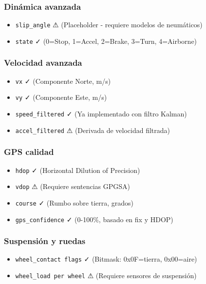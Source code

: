 \documentclass[11pt,a4paper]{article}
\begin{document}
\subsubsection{Dinámica avanzada}
\begin{itemize}
    \item \texttt{slip\_angle} ⚠ (Placeholder - requiere modelos de neumáticos)
    \item \texttt{state} ✓ (0=Stop, 1=Accel, 2=Brake, 3=Turn, 4=Airborne)
\end{itemize}

\subsubsection{Velocidad avanzada}
\begin{itemize}
    \item \texttt{vx} ✓ (Componente Norte, m/s)
    \item \texttt{vy} ✓ (Componente Este, m/s)
    \item \texttt{speed\_filtered} ✓ (Ya implementado con filtro Kalman)
    \item \texttt{accel\_filtered} ⚠ (Derivada de velocidad filtrada)
\end{itemize}

\subsubsection{GPS calidad}
\begin{itemize}
    \item \texttt{hdop} ✓ (Horizontal Dilution of Precision)
    \item \texttt{vdop} ⚠ (Requiere sentencias GPGSA)
    \item \texttt{course} ✓ (Rumbo sobre tierra, grados)
    \item \texttt{gps\_confidence} ✓ (0-100\%, basado en fix y HDOP)
\end{itemize}

\subsubsection{Suspensión y ruedas}
\begin{itemize}
    \item \texttt{wheel\_contact flags} ✓ (Bitmask: 0x0F=tierra, 0x00=aire)
    \item \texttt{wheel\_load per wheel} ⚠ (Requiere sensores de suspensión)
\end{itemize}
\end{document}
